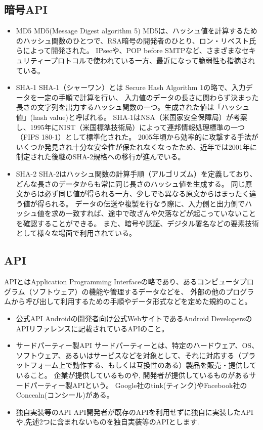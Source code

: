 \subsection{暗号API}
\begin{itemize}
\item MD5
MD5(Message Digest algorithm 5)
MD5は、ハッシュ値を計算するためのハッシュ関数のひとつで、RSA暗号の開発者のひとり、ロン・リベスト氏らによって開発された。
IPsecや、POP before SMTPなど、さまざまなセキュリティープロトコルで使われている一方、最近になって脆弱性も指摘されている。

\item SHA-1
SHA-1（シャーワン）とは Secure Hash Algorithm 1の略で、入力データを一定の手順で計算を行い、
入力値のデータの長さに関わらず決まった長さの文字列を出力するハッシュ関数の一つ。生成された値は「ハッシュ値」(hash value)と呼ばれる。
SHA-1はNSA（米国家安全保障局）が考案し、1995年にNIST（米国標準技術局）によって連邦情報処理標準の一つ（FIPS 180-1）として標準化された。
2005年頃から効率的に攻撃する手法がいくつか発見され十分な安全性が保たれなくなったため、近年では2001年に制定された後継のSHA-2規格への移行が進んでいる。

\item SHA-2
SHA-2はハッシュ関数の計算手順（アルゴリズム）を定義しており、どんな長さのデータからも常に同じ長さのハッシュ値を生成する。
同じ原文からは必ず同じ値が得られる一方、少しでも異なる原文からはまったく違う値が得られる。
データの伝送や複製を行なう際に、入力側と出力側でハッシュ値を求め一致すれば、途中で改ざんや欠落などが起こっていないことを確認することができる。
また、暗号や認証、デジタル署名などの要素技術として様々な場面で利用されている。　
\end{itemize}

\subsection{API}
APIとはApplication Programming Interfaceの略であり、あるコンピュータプログラム（ソフトウェア）の機能や管理するデータなどを、
外部の他のプログラムから呼び出して利用するための手順やデータ形式などを定めた規約のこと。
\begin{itemize}

\item 公式API
Androidの開発者向け公式WebサイトであるAndroid DevelopersのAPIリファレンスに記載されているAPIのこと。

\item サードパーティー製API
サードパーティーとは、特定のハードウェア、OS、ソフトウェア、あるいはサービスなどを対象として、それに対応する（プラットフォーム上で動作する、もしくは互換性のある）製品を販売・提供していること。
企業が提供しているものや, 開発者が提供しているものがあるサードパーティー製APIという。
Google社のtink(ティンク)やFacebook社のConcealn(コンシール)がある。


\item 独自実装等のAPI
API開発者が既存のAPIを利用せずに独自に実装したAPIや,先述2つに含まれないものを独自実装等のAPIとします.

\end{itemize}

